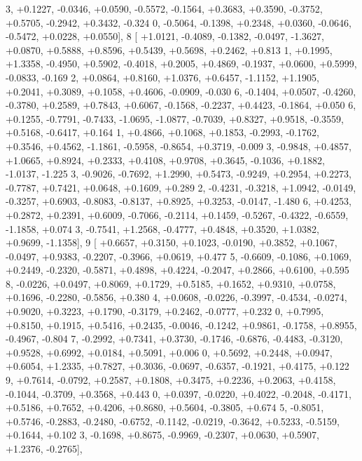 \begin{DoxyCode}
      3, +0.1227, -0.0346, +0.0590, -0.5572, -0.1564, +0.3683, +0.3590, -0.3752, +0.5705, -0.2942, +0.3432, -0.324
      0, -0.5064, -0.1398, +0.2348, +0.0360, -0.0646, -0.5472, +0.0228, +0.0550],
8 [ +1.0121, -0.4089, -0.1382, -0.0497, -1.3627, +0.0870, +0.5888, +0.8596, +0.5439, +0.5698, +0.2462, +0.813
      1, +0.1995, +1.3358, -0.4950, +0.5902, -0.4018, +0.2005, +0.4869, -0.1937, +0.0600, +0.5999, -0.0833, -0.169
      2, +0.0864, +0.8160, +1.0376, +0.6457, -1.1152, +1.1905, +0.2041, +0.3089, +0.1058, +0.4606, -0.0909, -0.030
      6, -0.1404, +0.0507, -0.4260, -0.3780, +0.2589, +0.7843, +0.6067, -0.1568, -0.2237, +0.4423, -0.1864, +0.050
      6, +0.1255, -0.7791, -0.7433, -1.0695, -1.0877, -0.7039, +0.8327, +0.9518, -0.3559, +0.5168, -0.6417, +0.164
      1, +0.4866, +0.1068, +0.1853, -0.2993, -0.1762, +0.3546, +0.4562, -1.1861, -0.5958, -0.8654, +0.3719, -0.009
      3, -0.9848, +0.4857, +1.0665, +0.8924, +0.2333, +0.4108, +0.9708, +0.3645, -0.1036, +0.1882, -1.0137, -1.225
      3, -0.9026, -0.7692, +1.2990, +0.5473, -0.9249, +0.2954, +0.2273, -0.7787, +0.7421, +0.0648, +0.1609, +0.289
      2, -0.4231, -0.3218, +1.0942, -0.0149, -0.3257, +0.6903, -0.8083, -0.8137, +0.8925, +0.3253, -0.0147, -1.480
      6, +0.4253, +0.2872, +0.2391, +0.6009, -0.7066, -0.2114, +0.1459, -0.5267, -0.4322, -0.6559, -1.1858, +0.074
      3, -0.7541, +1.2568, -0.4777, +0.4848, +0.3520, +1.0382, +0.9699, -1.1358],
9 [ +0.6657, +0.3150, +0.1023, -0.0190, +0.3852, +0.1067, -0.0497, +0.9383, -0.2207, -0.3966, +0.0619, +0.477
      5, -0.6609, -0.1086, +0.1069, +0.2449, -0.2320, -0.5871, +0.4898, +0.4224, -0.2047, +0.2866, +0.6100, +0.595
      8, -0.0226, +0.0497, +0.8069, +0.1729, +0.5185, +0.1652, +0.9310, +0.0758, +0.1696, -0.2280, -0.5856, +0.380
      4, +0.0608, -0.0226, -0.3997, -0.4534, -0.0274, +0.9020, +0.3223, +0.1790, -0.3179, +0.2462, -0.0777, +0.232
      0, +0.7995, +0.8150, +0.1915, +0.5416, +0.2435, -0.0046, -0.1242, +0.9861, -0.1758, +0.8955, -0.4967, -0.804
      7, -0.2992, +0.7341, +0.3730, -0.1746, -0.6876, -0.4483, -0.3120, +0.9528, +0.6992, +0.0184, +0.5091, +0.006
      0, +0.5692, +0.2448, +0.0947, +0.6054, +1.2335, +0.7827, +0.3036, -0.0697, -0.6357, -0.1921, +0.4175, +0.122
      9, +0.7614, -0.0792, +0.2587, +0.1808, +0.3475, +0.2236, +0.2063, +0.4158, -0.1044, -0.3709, +0.3568, +0.443
      0, +0.0397, -0.0220, +0.4022, -0.2048, -0.4171, +0.5186, +0.7652, +0.4206, +0.8680, +0.5604, -0.3805, +0.674
      5, -0.8051, +0.5746, -0.2883, -0.2480, -0.6752, -0.1142, -0.0219, -0.3642, +0.5233, -0.5159, +0.1644, +0.102
      3, -0.1698, +0.8675, -0.9969, -0.2307, +0.0630, +0.5907, +1.2376, -0.2765],

\end{DoxyCode}
